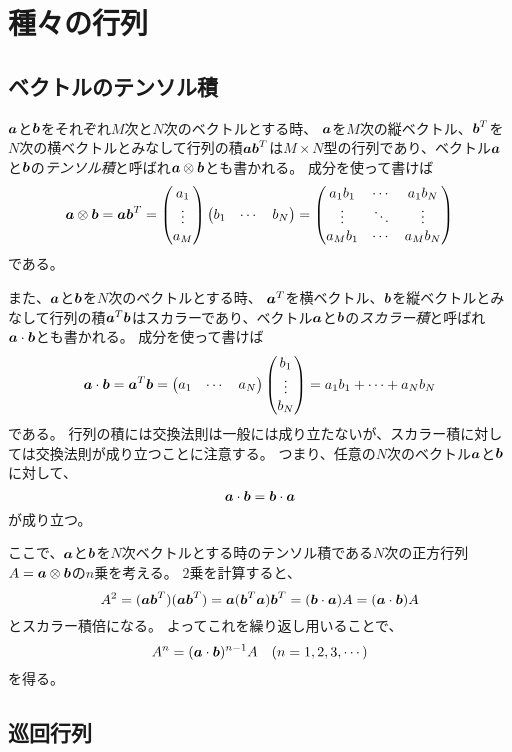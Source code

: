 
\chapter{種々の行列}

\section{ベクトルのテンソル積}

$\vb*{a}$と$\vb*{b}$をそれぞれ$M$次と$N$次のベクトルとする時、
$\vb*{a}$を$M$次の縦ベクトル、$\vb*{b}^T$を$N$次の横ベクトルとみなして行列の積$\vb*{a}\vb*{b}^T$は$M\times N$型の行列であり、ベクトル$\vb*{a}$と$\vb*{b}$の\emph{テンソル積}と呼ばれ$\vb*{a}\otimes\vb*{b}$とも書かれる。
成分を使って書けば
$$
\vb*{a}\otimes\vb*{b}
= \vb*{a}\vb*{b}^T
= \begin{pmatrix}a_1 \\ \vdots \\ a_M\end{pmatrix}\begin{pmatrix}b_1 & \cdots & b_N\end{pmatrix}
=
\begin{pmatrix}
a_1 b_1 & \cdots & a_1 b_N \\
\vdots  & \ddots & \vdots  \\
a_M b_1 & \cdots & a_M b_N \\
\end{pmatrix}
$$
である。

また、$\vb*{a}$と$\vb*{b}$を$N$次のベクトルとする時、
$\vb*{a}^T$を横ベクトル、$\vb*{b}$を縦ベクトルとみなして行列の積$\vb*{a}^T\vb*{b}$はスカラーであり、ベクトル$\vb*{a}$と$\vb*{b}$の\emph{スカラー積}と呼ばれ$\vb*{a}\cdot\vb*{b}$とも書かれる。
成分を使って書けば
$$
\vb*{a}\cdot\vb*{b}
= \vb*{a}^T\vb*{b}
= \begin{pmatrix}a_1 & \cdots & a_N\end{pmatrix}\begin{pmatrix}b_1 \\ \vdots \\ b_N\end{pmatrix}
= a_1 b_1+\cdots+a_N b_N
$$
である。
行列の積には交換法則は一般には成り立たないが、スカラー積に対しては交換法則が成り立つことに注意する。
つまり、任意の$N$次のベクトル$\vb*{a}$と$\vb*{b}$に対して、
$$
\vb*{a}\cdot\vb*{b} = \vb*{b}\cdot\vb*{a}
$$
が成り立つ。

ここで、$\vb*{a}$と$\vb*{b}$を$N$次ベクトルとする時のテンソル積である$N$次の正方行列$A = \vb*{a}\otimes\vb*{b}$の$n$乗を考える。
$2$乗を計算すると、
$$
A^2 = (\vb*{a}\vb*{b}^T)(\vb*{a}\vb*{b}^T) = \vb*{a}(\vb*{b}^T\vb*{a})\vb*{b}^T = (\vb*{b}\cdot\vb*{a})A = (\vb*{a}\cdot\vb*{b})A
$$
とスカラー積倍になる。
よってこれを繰り返し用いることで、
$$
A^n = (\vb*{a}\cdot\vb*{b})^{n-1}A
\quad (n = 1, 2, 3, \cdots)
$$
を得る。

\section{巡回行列}
